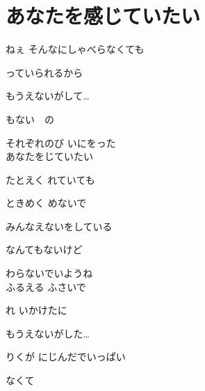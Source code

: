 \section{ あなたを感じていたい}

\large{

ねぇ そんなにしゃべらなくても

っていられるから

もうえないがして…

もない　の

それぞれのび いにをった
\\

あなたをじていたい

たとえく れていても

ときめく めないで

みんなえないをしている

なんてもないけど

わらないでいようね
\\

ふるえる ふさいで

れ いかけたに

もうえないがした…

りくが にじんだでいっぱい

なくて
\\


}
